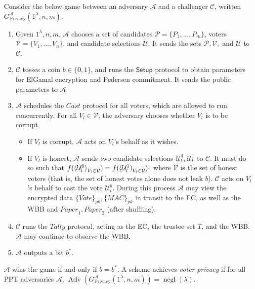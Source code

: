 \documentclass[12pt,a4paper]{article}
\DeclareMathOperator{\negl}{\text{negl}}
\DeclareMathOperator{\Adv}{\text{Adv}}
\theoremstyle{definition}
\newcommand{\Vote}{\mathit{Vote}}
\newcommand{\Paper}{\mathit{Paper}}
\newcommand{\Mac}{\mathit{MAC}}
\begin{document}
\begin{definition}
    Consider the below game between an adversary $\mathcal{A}$ and a challenger $\mathcal{C}$, written $G^\mathcal{A}_{\text{Privacy}}(1^\lambda, n, m)$.
    \begin{enumerate}
        \item Given $1^\lambda, n, m$, $\mathcal{A}$ chooses a set of candidates $\mathcal{P}=\{P_1,\ldots,P_m\}$, voters $\mathcal{V}=\{V_1,\ldots,V_n\}$, and candidate selections $\mathcal{U}$. It sends the sets $\mathcal{P}, \mathcal{V},$ and $\mathcal{U}$ to $\mathcal{C}$.
        \item $\mathcal{C}$ tosses a coin $b\in\{0, 1\}$, and runs the $\mathsf{Setup}$ protocol to obtain parameters for ElGamal encryption and Pedersen commitment. It sends the public parameters to $\mathcal{A}$.
        \item $\mathcal{A}$ schedules the $\mathit{Cast}$ protocol for all voters, which are allowed to run concurrently. For all $V_l\in\mathcal{V}$, the adversary chooses whether $V_l$ is to be corrupt.
        \begin{itemize}
            \item If $V_l$ is corrupt, $\mathcal{A}$ acts on $V_l$'s behalf as it wishes.
            \item If $V_l$ is honest, $\mathcal{A}$ sends two candidate selections $\mathcal{U}_l^0, \mathcal{U}_l^1$ to $\mathcal{C}$. It must do so such that $f(\langle\mathcal{U}_l^0\rangle_{V_l\in \tilde{\mathcal{V}}})=f(\langle\mathcal{U}^1_l)_{V_l\in \tilde{\mathcal{V}}}\rangle`$ where $\tilde{\mathcal{V}}$ is the set of honest voters (that is, the set of honest votes alone does not leak $b$). $\mathcal{C}$ acts on $V_l$'s behalf to cast the vote $\mathcal{U}_l^b$. During this process $\mathcal{A}$ may view the encrypted data $\{\Vote\}_{\mathit{pk}}, \{\Mac\}_{\mathit{pk}}$ in transit to the EC, as well as the WBB and $\Paper_1, \Paper_2$ (after shuffling).
        \end{itemize}
        \item $\mathcal{C}$ runs the $\mathit{Tally}$ protocol, acting as the EC, the trustee set $T$, and the WBB. $\mathcal{A}$ may continue to observe the WBB.
        \item $\mathcal{A}$ outputs a bit $b^*$.
    \end{enumerate}
    $\mathcal{A}$ wins the game if and only if $b=b^*$. A scheme achieves \textit{voter privacy} if for all PPT adversaries $\mathcal{A}$, $\Adv\left(G^\mathcal{A}_{\text{Privacy}}(1^\lambda, n, m)\right)=\negl(\lambda)$.
\end{definition}
\end{document}
